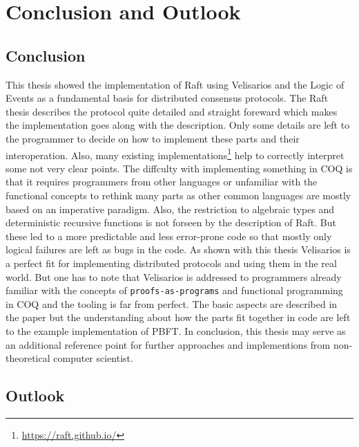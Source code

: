 %
\section{Conclusion and Outlook}
\label{sec_conclusion}


\subsection{Conclusion}

This thesis showed the implementation of Raft using
Velisarios and the Logic of Events as a fundamental
basis for distributed consensus protocols. The Raft
thesis describes the protocol quite detailed and
straight foreward which makes the implementation
goes along with the description. Only some details
are left to the programmer to decide on how to implement
these parts and their interoperation. Also, many existing
implementations\footnote{\url{https://raft.github.io/}}
help to correctly interpret some not very clear points.
The diffculty with implementing something in COQ is that
it requires programmers from other languages or unfamiliar
with the functional concepts to rethink many parts
as other common languages are mostly based on an imperative
paradigm. Also, the
restriction to algebraic types and deterministic recursive
functions is not forseen by the description of Raft.
But these led to a more predictable and less error-prone
code so that mostly only logical failures are left as
bugs in the code. As shown with this thesis Velisarios
is a perfect fit for implementing distributed protocols
and using them in the real world. But one has to note that
Velisarios is addressed to programmers already familiar with the
concepts of \texttt{proofs-as-programs} and functional
programming in COQ and the tooling is far from perfect.
The basic aspects are described in the paper but the understanding about how the
parts fit together in code are left to the example
implementation of PBFT. In conclusion, this thesis
may serve as an additional reference point for
further approaches and implementions from non-theoretical
computer scientist.

\subsection{Outlook}

